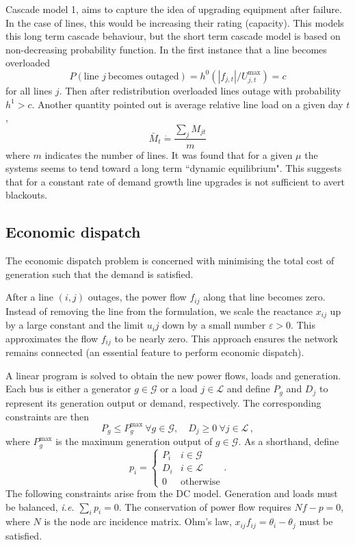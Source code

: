 \documentclass{article}
\newcommand{\ie}{\textit{i.e. }}
\newcommand{\e}{\varepsilon}
\newcommand{\mc}{\mathcal}
\renewcommand{\t}{\text}
\begin{document}
Cascade model 1, aims to capture the idea of upgrading equipment after failure. In the case of lines, this would be increasing their rating (capacity). This models this long term cascade behaviour, but the short term cascade model is based on non-decreasing probability function. In the first instance that a line becomes overloaded
\begin{equation}
P(\text{line } j \ \text{becomes outaged}) = h^0(|f_{j,t}|/U_{j,t}^{\text{max}})=c
\end{equation}
for all lines $j$. Then after redistribution overloaded lines outage with probability $h^1>c$. Another quantity pointed out is average relative line load on a given day $t$,
\begin{equation}
\bar{M}_t \dot{=}\frac{\sum_j M_{jt}}{m}
\end{equation}
where $m$ indicates the number of lines. It was found that for a given $\mu$ the systems seems to tend toward a long term ``dynamic equilibrium". This suggests that for a constant rate of demand growth line upgrades is not sufficient to avert blackouts.\\

\subsection{Economic dispatch}

The economic dispatch problem is concerned with minimising the total cost of generation such that the demand is satisfied.  

After a line $(i,j)$ outages, the power flow $f_{ij}$ along that line becomes zero. Instead of removing the line from the formulation, we scale the reactance $x_{ij}$ up by a large constant and the limit $u_ij$ down by a small number $\e>0$. This approximates the flow $f_{ij}$ to be nearly zero. This approach ensures the network remains connected (an essential feature to perform economic dispatch). 

A linear program is solved to obtain the new power flows, loads and generation. Each bus is either a generator $g\in \mc G$ or a load $j\in \mc L$ and define $P_g$ and $D_j$ to represent its generation output or demand, respectively. The corresponding constraints are then
\[P_g \le P_g^{\t{max}} \ \forall g\in \mc G, \quad D_j \ge 0 \ \forall j\in \mc L\,,\]
 where $P_g^{\t{max}}$ is the maximum generation output of $g\in \mc G$. As a shorthand, define 
 \[p_i = \begin{cases}P_i & i\in \mc G\\ D_i & i\in \mc L\\ 0 & \t{otherwise} \end{cases}.\]
 The following constraints arise from the DC model. Generation and loads must be balanced, \ie $\sum_i p_i =0$. The conservation of power flow requires $Nf-p=0$, where $N$ is the node arc incidence matrix. Ohm's law, $x_{ij}f_{ij} = \theta_i-\theta_j$ must be satisfied. 
\end{document}
